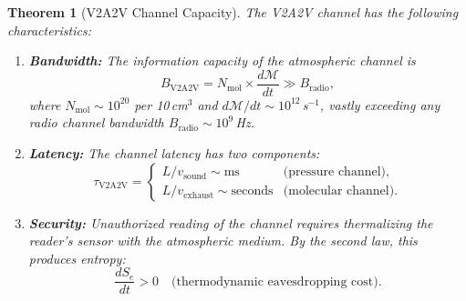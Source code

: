 \documentclass[11pt,twocolumn,a4paper]{article}
\theoremstyle{plain}
\newtheorem{theorem}{Theorem}[section]
\theoremstyle{definition}
\theoremstyle{remark}
\newcommand{\Se}{S_e}
\newcommand{\Depth}{\mathcal{M}}
\begin{document}
\begin{theorem}[V2A2V Channel Capacity]
\label{thm:v2a2v}
The V2A2V channel has the following characteristics:
\begin{enumerate}[nosep]
    \item \textbf{Bandwidth:} The information capacity of the atmospheric channel is
    \begin{equation}
    B_{\mathrm{V2A2V}} = N_{\mathrm{mol}} \times \frac{d\Depth}{dt} \gg B_{\mathrm{radio}},
    \label{eq:v2a2v_bandwidth}
    \end{equation}
    where $N_{\mathrm{mol}} \sim 10^{20}$ per 10\,cm$^3$ and $d\Depth/dt \sim 10^{12}$\,s$^{-1}$, vastly exceeding any radio channel bandwidth $B_{\mathrm{radio}} \sim 10^9$\,Hz.

    \item \textbf{Latency:} The channel latency has two components:
    \begin{equation}
    \tau_{\mathrm{V2A2V}} = \begin{cases} L/v_{\mathrm{sound}} \sim \text{ms} & \text{(pressure channel)},\\ L/v_{\mathrm{exhaust}} \sim \text{seconds} & \text{(molecular channel)}. \end{cases}
    \label{eq:v2a2v_latency}
    \end{equation}

    \item \textbf{Security:} Unauthorized reading of the channel requires thermalizing the reader's sensor with the atmospheric medium. By the second law, this produces entropy:
    \begin{equation}
    \frac{d\Se}{dt} > 0 \quad \text{(thermodynamic eavesdropping cost)}.
    \label{eq:v2a2v_security}
    \end{equation}
\end{enumerate}
\end{theorem}
\end{document}
